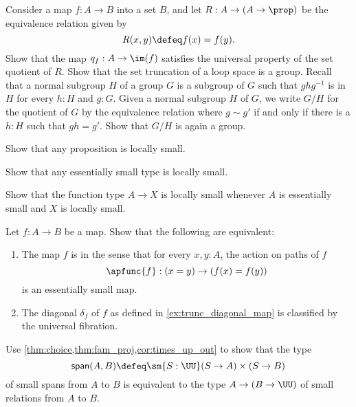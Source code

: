 \begin{exercises}
  \exercise Consider a map $f:A\to B$ into a set $B$, and let $R:A\to(A\to\prop)$ be the equivalence relation given by
  \begin{equation*}
    R(x,y)\defeq f(x)=f(y).
  \end{equation*}
  Show that the map $q_f:A\to\im(f)$ satisfies the universal property of the set quotient of $R$.
  \exercise Show that the set truncation of a loop space is a group.
  \exercise Recall that a normal subgroup $H$ of a group $G$ is a subgroup of $G$ such that $ghg^{-1}$ is in $H$ for every $h:H$ and $g:G$. Given a normal subgroup $H$ of $G$, we write $G/H$ for the quotient of $G$ by the equivalence relation where $g\sim g'$ if and only if there is a $h:H$ such that $gh=g'$. Show that $G/H$ is again a group. 
\exercise
\begin{subexenum}
\item Show that any proposition is locally small.
\item Show that any essentially small type is locally small.
\item Show that the function type $A\to X$ is locally small whenever $A$ is essentially small and $X$ is locally small.
\end{subexenum}
\exercise Let $f:A\to B$ be a map. Show that the following are equivalent:
\begin{enumerate}
\item The map $f$ is  in the sense that for every $x,y:A$, the action on paths of $f$
\begin{equation*}
\apfunc{f}:(x=y)\to (f(x)=f(y))
\end{equation*}
is an essentially small map.
\item The diagonal $\delta_f$ of $f$ as defined in \cref{ex:trunc_diagonal_map} is classified by the universal fibration.
\end{enumerate}
\exercise \label{ex:span_rel}Use \cref{thm:choice,thm:fam_proj,cor:times_up_out} to show that the type 
\begin{equation*}
\mathsf{span}(A,B)\defeq \sm{S:\UU} (S\to A)\times (S\to B)
\end{equation*}
of small spans from $A$ to $B$ is equivalent to the type $A\to (B\to\UU)$ of small relations from $A$ to $B$.
\end{exercises}

